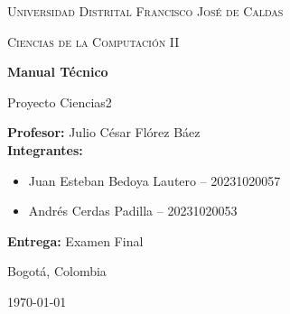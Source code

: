 \documentclass[12pt,onecolumn]{IEEEtran}
\begin{document}
\begin{titlepage}
\centering

\vspace*{1.5cm}

{\scshape\LARGE Universidad Distrital Francisco José de Caldas \par}

\vspace{0.5cm}

{\scshape\Large Ciencias de la Computación II \par}

\vspace{2.5cm}

{\Huge\bfseries Manual Técnico \par}

\vspace{0.7cm}

{\LARGE Proyecto Ciencias2 \par}

\vspace{2cm}

\begin{flushleft}
\large
\textbf{Profesor:} Julio César Flórez Báez \\[0.4cm]

\textbf{Integrantes:}
\begin{itemize}
    \item Juan Esteban Bedoya Lautero -- 20231020057
    \item Andrés Cerdas Padilla -- 20231020053
\end{itemize}

\vspace{0.3cm}

\textbf{Entrega:} Examen Final
\end{flushleft}

\vfill

{\large Bogotá, Colombia \par}
{\large \today \par}

\end{titlepage}

\begin{abstract}
Este documento presenta el manual técnico del proyecto final \textit{Ciencias2}, una aplicación académica desarrollada para simular estructuras de datos, algoritmos de búsqueda, indices de almacenamiento secundario y operaciones sobre grafos. La documentación describe la arquitectura modular del sistema, sus tecnologías, la organización de los servicios, el esquema de persistencia por snapshots y la interfaz REST expuesta por FastAPI. El manual esta redactado en español y estructurado con un estilo académico compatible con IEEE.
\end{abstract}
\end{document}
